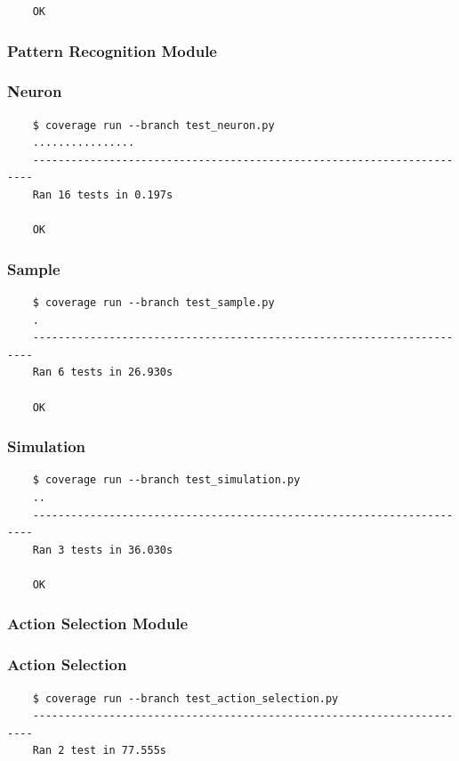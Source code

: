 \documentclass[a4paper,11pt]{article}
\begin{document}
\begin{appendices}
\begin{verbatim}
    OK
\end{verbatim}

\subsubsection{Pattern Recognition Module}
\subsubsection*{{\hspace{6mm}}Neuron}
\begin{verbatim}
    $ coverage run --branch test_neuron.py
    ................
    ----------------------------------------------------------------------
    Ran 16 tests in 0.197s

    OK
\end{verbatim}

\subsubsection*{{\hspace{6mm}}Sample}
\begin{verbatim}
    $ coverage run --branch test_sample.py
    .
    ----------------------------------------------------------------------
    Ran 6 tests in 26.930s

    OK
\end{verbatim}

\subsubsection*{{\hspace{6mm}}Simulation}
\begin{verbatim}
    $ coverage run --branch test_simulation.py
    ..
    ----------------------------------------------------------------------
    Ran 3 tests in 36.030s

    OK
\end{verbatim}

\subsubsection{Action Selection Module}
\subsubsection*{{\hspace{6mm}}Action Selection}
\begin{verbatim}
    $ coverage run --branch test_action_selection.py
    ----------------------------------------------------------------------
    Ran 2 test in 77.555s


\end{verbatim}
\end{appendices}
\end{document}
